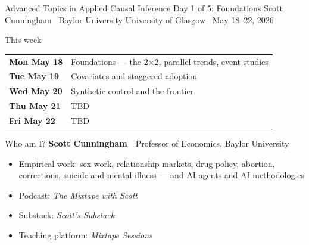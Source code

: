 \documentclass[aspectratio=169,11pt]{beamer}
\begin{document}

\remixtitleframe
  {Advanced Topics in Applied Causal Inference}
  {Day 1 of 5: Foundations}
  {Scott Cunningham \textperiodcentered\ Baylor University}
  {University of Glasgow \textperiodcentered\ May 18--22, 2026}

\begin{frame}{This week}
\vspace{0.3em}
\begin{center}
\renewcommand{\arraystretch}{1.5}
\begin{tabular}{@{}p{}p{}@{}}
\textbf{\color{accent}Mon May 18} & Foundations --- the 2{$\times$}2, parallel trends, event studies \\
\textbf{\color{accent}Tue May 19} & Covariates and staggered adoption \\
\textbf{\color{accent}Wed May 20} & Synthetic control and the frontier \\
\textbf{\color{accent}Thu May 21} & TBD \\
\textbf{\color{accent}Fri May 22} & TBD \\
\end{tabular}
\end{center}
\end{frame}

\begin{frame}{Who am I?}
\vspace{0.5em}
\textbf{Scott Cunningham} \,\textperiodcentered\, Professor of Economics, Baylor University
\vspace{0.8em}
\begin{itemize}
  \item Empirical work: sex work, relationship markets, drug policy, abortion, corrections, suicide and mental illness --- and AI agents and AI methodologies
  \item Podcast: \textit{The Mixtape with Scott}
  \item Substack: \textit{Scott's Substack}
  \item Teaching platform: \textit{Mixtape Sessions}
\end{itemize}
\end{frame}
\end{document}
